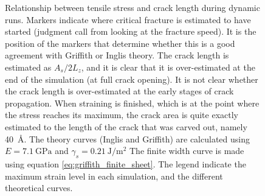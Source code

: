 \begin{figure}
\caption{Relationship between tensile stress and crack length during dynamic runs. Markers indicate where critical fracture is estimated to have started (judgment call from looking at the fracture speed). It is the position of the markers that determine whether this is a good agreement with Griffith or Inglis theory. The crack length is estimated as $A_s/2L_z$, and it is clear that it is over-estimated at the end of the simulation (at full crack opening). It is not clear whether the crack length is over-estimated at the early stages of crack propagation. When straining is finished, which is at the point where the stress reaches its maximum, the crack area is quite exactly estimated to the length of the crack that was carved out, namely \SI{40}{\angstrom}. The theory curves (Inglis and Griffith) are calculated using $E=\SI{7.1}{\giga\pascal}$ and $\gamma_s = \SI{0.21}{\joule\per\meter\squared}$ The finite width curve is made using equation \ref{eq:griffith_finite_sheet}. The legend indicate the maximum strain level in each simulation, and the different theoretical curves.}
\label{fig:fracture_theory_compare}
\end{figure}